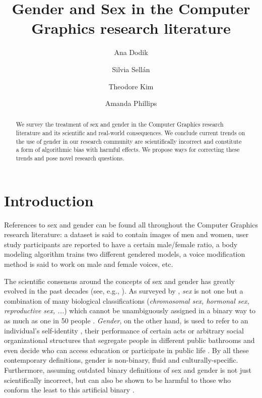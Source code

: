 \documentclass[nonacm,sigconf,review,balance=false]{acmart}
\begin{document}
\title{Gender and Sex in the Computer Graphics research literature}

\author{Ana Dodik}

\author{Silvia Sellán}\authornotemark[1]


\author{Theodore Kim}

\author{Amanda Phillips}


\begin{abstract}
    We survey the treatment of sex and gender in the Computer Graphics research
    literature and its scientific and real-world consequences. We conclude
    current trends on the use of gender in our research community are scientifically incorrect and constitute a
    form of algorithmic bias with harmful effects. We propose ways for
    correcting these trends and pose novel research questions.
\end{abstract}


\maketitle


\section{Introduction}

References to sex and gender can be found all throughout the Computer Graphics research literature: a dataset is said to contain images of men and women, user study participants are reported to have a certain male/female ratio, a body modeling algorithm trains two different gendered models, a voice modification method is said to work on male and female voices, etc.

The scientific consensus around the concepts of sex and gender has greatly evolved in the past decades (see, e.g., \cite{pmid30377332}). As surveyed by \citet{fausto2012sex}, \emph{sex} is not one but a combination of many biological classifications (\emph{chromosomal sex, hormonal sex, reproductive sex, ...}) which cannot be unambiguously assigned in a binary way to as much as one in 50 people \cite{blackless2000sexually}.
\emph{Gender}, on the other hand, is used to refer to an individual's self-identity \cite{money1972man}, their performance of certain acts \cite{butler2003gender} or arbitrary social organizational structures that segregate people in different public bathrooms and even decide who can access education or participate in public life \cite{lorber1994paradoxes}. By all these contemporary definitions, gender is non-binary, fluid and culturally-specific. Furthermore, assuming outdated binary definitions of sex and gender is not just scientifically incorrect, but can also be shown to be harmful to those who conform the least to this artificial binary \cite{un2015report}.
\end{document}
